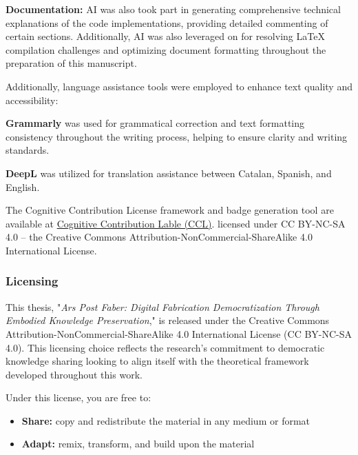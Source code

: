 \vspace{0.5cm}

\textbf{Documentation:} AI was also took part in generating comprehensive technical explanations of the code implementations, providing detailed commenting of certain sections. Additionally, AI was also leveraged on for resolving LaTeX compilation challenges and optimizing document formatting throughout the preparation of this manuscript.

\vspace{0.5cm}

Additionally, language assistance tools were employed to enhance text quality and accessibility:

\vspace{0.5cm}

\textbf{Grammarly} was used for grammatical correction and text formatting consistency throughout the writing process, helping to ensure clarity and writing standards.

\vspace{0.5cm}

\textbf{DeepL} was utilized for translation assistance between Catalan, Spanish, and English.

\vspace{0.5cm}

The Cognitive Contribution License framework and badge generation tool are available at \href{https://santifu.github.io/ccl/generator.html}{Cognitive Contribution Lable (CCL)}. licensed under CC BY-NC-SA 4.0 – the Creative Commons Attribution-NonCommercial-ShareAlike 4.0 International License.

\subsubsection{Licensing}

This thesis, "\textit{Ars Post Faber: Digital Fabrication Democratization Through Embodied Knowledge Preservation}," is released under the Creative Commons Attribution-NonCommercial-ShareAlike 4.0 International License (CC BY-NC-SA 4.0). This licensing choice reflects the research's commitment to democratic knowledge sharing looking to align itself with the theoretical framework developed throughout this work.

\vspace{0.5cm}

Under this license, you are free to:

\begin{itemize}
\item \textbf{Share:} copy and redistribute the material in any medium or format
\item \textbf{Adapt:} remix, transform, and build upon the material
\end{itemize}

